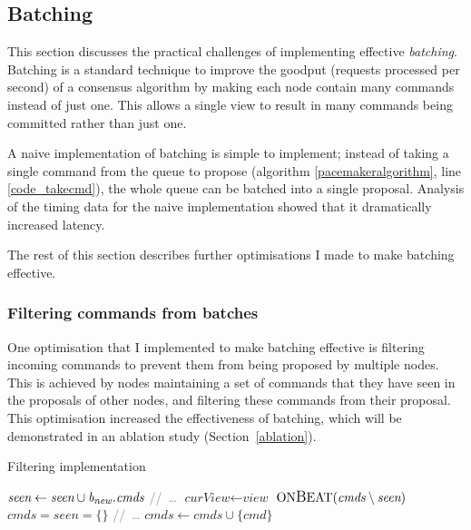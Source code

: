 \subsection{Batching} \label{batching}
This section discusses the practical challenges of implementing effective \textit{batching}. Batching is a standard technique to improve the goodput (requests processed per second) of a consensus algorithm by making each node contain many commands instead of just one. This allows a single view to result in many commands being committed rather than just one.

A naive implementation of batching is simple to implement; instead of taking a single command from the queue to propose (algorithm \ref{pacemakeralgorithm}, line \ref{code_takecmd}), the whole queue can be batched into a single proposal. Analysis of the timing data for the naive implementation showed that it dramatically increased latency.

The rest of this section describes further optimisations I made to make batching effective.

\subsubsection{Filtering commands from batches} \label{filtering}
One optimisation that I implemented to make batching effective is filtering incoming commands to prevent them from being proposed by multiple nodes. This is achieved by nodes maintaining a set of commands that they have seen in the proposals of other nodes, and filtering these commands from their proposal. This optimisation increased the effectiveness of batching, which will be demonstrated in an ablation study (Section~\ref{ablation}).

\begin{algorithm}[h!]
	\caption{Filtering implementation} \label{dedup}
	\begin{algorithmic}[1]
			\State $ \textit{seen} \gets \textit{seen} \cup \textit{b\textsubscript{new}.cmds}$
			\State \textcolor{gray}{//\ \dots}
		\EndIf
	\EndProcedure
		\State $ \textit{curView} \gets \textit{view}$
		\State $ \text{ON{\large B}EAT}(\textit{cmds} \setminus \textit{seen})$
		\State $ \textit{cmds} = \textit{seen} = \{\}$ \label{smalloptimisation}
		\State \textcolor{gray}{//\ \dots}
	\EndProcedure
		\State $ \textit{cmds} \gets \textit{cmds} \cup \{\textit{cmd}\} $
	\EndProcedure
	\end{algorithmic}
\end{algorithm}

